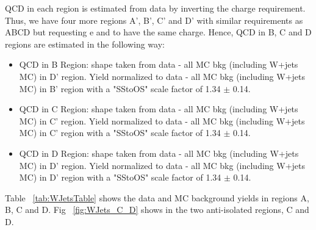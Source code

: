 QCD in each region is estimated from data by inverting the charge
requirement.  Thus, we have four more regions A', B', C' and D' with
similar requirements as ABCD but requesting e and \tauh to have the
same charge. Hence, QCD in B, C and D regions are estimated in the
following way:
\begin{itemize}
  \item QCD in B Region: shape taken from data - all MC bkg (including W+jets MC) in D' region. 
Yield normalized to data - all MC bkg (including W+jets MC) in B' region with a "SStoOS" scale 
factor of 1.34 $\pm$ 0.14.
  \item QCD in C Region: shape taken from data - all MC bkg (including W+jets MC) in C' region. 
Yield normalized to data - all MC bkg (including W+jets MC) in C' region with a "SStoOS" scale 
factor of 1.34 $\pm$ 0.14.
  \item QCD in D Region: shape taken from data - all MC bkg (including W+jets MC) in D' region. 
Yield normalized to data - all MC bkg (including W+jets MC) in D' region with a "SStoOS" scale 
factor of 1.34 $\pm$ 0.14.
\end{itemize}

Table ~\ref{tab:WJetsTable} shows the data and MC background yields in regions A, B, C and D.
Fig ~\ref{fig:WJets_C_D} shows in the two anti-isolated regions, C and D.

